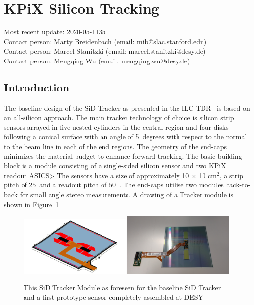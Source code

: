 \newcommand{\LYCORIS}{{\textsc{Lycoris}}\xspace}
\newcommand{\DESYII}{{\mbox{DESY II}}\xspace}
\newcommand{\DIITBF}{{\DESYII Test Beam Facility}\xspace}
\newcommand{\SID}{{SiD}\xspace}
\newcommand{\KPIX}{{KPiX}\xspace}


\section{\KPIX Silicon Tracking}
Most recent update: 2020-05-1135 \\
Contact person: Marty Breidenbach (email: mib@slac.stanford.edu)\\
Contact person: Marcel Stanitzki (email: marcel.stanitzki@desy.de)\\
Contact person: Mengqing Wu (email: mengqing.wu@desy.de)\\




\subsection{Introduction}
The baseline design of the \SID Tracker as presented in the ILC TDR~\cite{Behnke:2013lya} is based on an all-silicon approach.
The main tracker technology of choice is silicon strip sensors arrayed in five nested cylinders in the central
region and four disks following a conical surface with an angle of 5~degrees with respect to the normal to the 
beam line in each of the end regions. The geometry of the end-caps minimizes the material budget to enhance 
forward tracking. The basic building block is a module consisting of a single-sided silicon sensor and two \KPIX readout ASICS>
The sensors have a size of  approximately 10 $\times$ 10 cm$^2$, a strip pitch of 25~\micron and a readout pitch of 50~\micron. 
The end-caps utilise two modules back-to-back for small angle stereo measurements. 
A drawing of a Tracker module is shown in Figure~\ref{fig:SiliconTrackin:KPiX:module}
\begin{figure}
\includegraphics[width=0.49\textwidth]{Tracker/KPIX/Tracker_Module_SiD_Drawing.png}
\includegraphics[width=0.49\textwidth]{Tracker/KPIX/Tracker_Module_SiD_Photo.jpg}
\caption{This \SID Tracker Module as foreseen for the baseline \SID Tracker\cite{Behnke:2013lya} and a first prototype sensor completely assembled at DESY}
\label{fig:SiliconTrackin:KPiX:module}
\end{figure}

